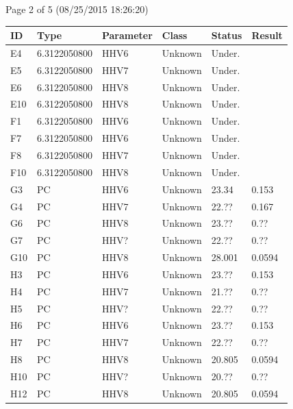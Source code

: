 \documentclass[UTF8,10pt,a4paper,fontset=fandol]{ctexart}
\begin{document}
\vfill

\begin{flushleft}
\scriptsize Page 2 of 5 (08/25/2015 18:26:20)
\end{flushleft}

\newpage


\begin{center}
\small
\begin{tabular}{@{}llllll@{}}
\textbf{ID} & \textbf{Type} & \textbf{Parameter} & \textbf{Class} & \textbf{Status} & \textbf{Result} \\
\hline
E4  & 6.3122050800 & HHV6 & Unknown & Under. & \\
E5  & 6.3122050800 & HHV7 & Unknown & Under. & \\
E6  & 6.3122050800 & HHV8 & Unknown & Under. & \\
E10 & 6.3122050800 & HHV8 & Unknown & Under. & \\
F1  & 6.3122050800 & HHV6 & Unknown & Under. & \\
F7  & 6.3122050800 & HHV6 & Unknown & Under. & \\
F8  & 6.3122050800 & HHV7 & Unknown & Under. & \\
F10 & 6.3122050800 & HHV8 & Unknown & Under. & \\
G3  & PC & HHV6 & Unknown & 23.34 & 0.153 \\
G4  & PC & HHV7 & Unknown & 22.?? & 0.167 \\
G6  & PC & HHV8 & Unknown & 23.?? & 0.?? \\
G7  & PC & HHV? & Unknown & 22.?? & 0.?? \\
G10 & PC & HHV8 & Unknown & 28.001 & 0.0594 \\
H3  & PC & HHV6 & Unknown & 23.?? & 0.153 \\
H4  & PC & HHV7 & Unknown & 21.?? & 0.?? \\
H5  & PC & HHV? & Unknown & 22.?? & 0.?? \\
H6  & PC & HHV6 & Unknown & 23.?? & 0.153 \\
H7  & PC & HHV7 & Unknown & 22.?? & 0.?? \\
H8  & PC & HHV8 & Unknown & 20.805 & 0.0594 \\
H10 & PC & HHV? & Unknown & 20.?? & 0.?? \\
H12 & PC & HHV8 & Unknown & 20.805 & 0.0594 \\
\hline
\end{tabular}
\end{center}
\end{document}
